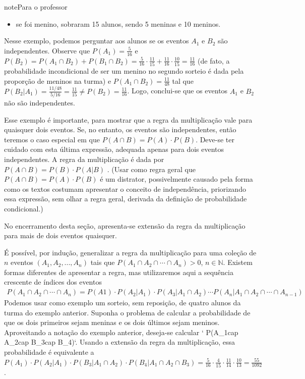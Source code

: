 \begin{sphinxadmonition}{note}{Para o professor}
\begin{itemize}
\item {} 
se foi menino, sobraram 15 alunos, sendo 5 meninas e 10 meninos.

\end{itemize}

Nesse exemplo, podemos perguntar aos alunos se os eventos \(A_1\) e \(B_2\) são independentes. Observe que \(P(A_1)=\frac{5}{16}\) e \(P(B_2)=P(A_1\cap B_2)+P(B_1\cap B_2)=\frac{5}{16}\cdot \frac{11}{15}+\frac{11}{16}\cdot\frac{10}{15}=\frac{11}{16}\) (de fato, a probabilidade incondicional de ser um menino no segundo sorteio é dada pela proporção de meninos na turma) e \(P(A_1 \cap B_2)=\frac{11}{48}\) tal que \(P(B_2|A_1)=\frac{11/48}{5/16}=\frac{11}{15}\neq P(B_2)=\frac{11}{16}\). Logo, conclui-se que os eventos \(A_1\) e \(B_2\) não são independentes.

Esse exemplo é importante, para mostrar que a regra da multiplicação vale para quaisquer dois eventos. Se, no entanto, os eventos são independentes, então teremos o caso especial em que \(P(A\cap B)=P(A)\cdot P(B)\). Deve-se ter cuidado com esta última expressão, adequada apenas para dois eventos independentes. A regra da multiplicação é dada por \(P(A\cap B)=P(B)\cdot P(A|B)\) . (Usar como regra geral que \(P(A\cap B)=P(A)\cdot P(B)\) é um distrator, possivelmente causado pela forma como os textos costumam apresentar o conceito de independência, priorizando essa expressão, sem olhar a regra geral, derivada da definição de probabilidade condicional.)

No encerramento desta seção, apresenta-se extensão da regra da multiplicação para mais de dois eventos quaisquer.

É possível, por indução, generalizar a regra da multiplicação para uma coleção de \(n\) eventos   \((A_1,A_2,...,A_n)\) tais que \(P(A_1\cap A_2\cap \cdots \cap A_n)>0\), \(n \in \mathbb{N}\).
Existem formas diferentes de apresentar a regra, mas utilizaremos aqui a sequência crescente de índices dos eventos
\begin{equation*}
\begin{split}P(A_1\cap A_2 \cap \cdots \cap A_n)=P(A1)\cdot P(A_2|A_1)\cdot P(A_3|A_1∩A_2)\cdots P(A_n|A_1\cap  A_2\cap \cdots \cap A_{n-1})\end{split}
\end{equation*}
Podemos usar como exemplo um sorteio, sem reposição, de quatro alunos da turma do exemplo anterior. Suponha o problema de calcular a probabilidade de que os dois primeiros sejam  meninas e os dois últimos sejam meninos. Aproveitando a notação do exemplo anterior, deseja-se calcular {}`       P(A\_1cap A\_2cap B\_3cap B\_4){}`. Usando a extensão da regra da multiplicação, essa probabilidade é equivalente a \(P(A_1)\cdot P(A_2|A_1)\cdot P(B_3|A_1\cap A_2)\cdot P(B_4|A_1\cap A_2\cap B_3)=\frac{5}{16}\cdot \frac{4}{15}\cdot \frac{11}{14}\cdot \frac{10}{13}=\frac{55}{1092}\).


\end{sphinxadmonition}
